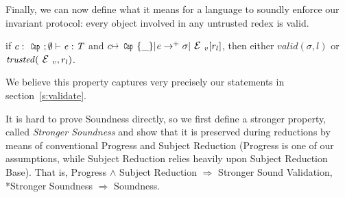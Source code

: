 \noindent Finally, we can now define what it means for a language to soundly enforce our invariant protocol: every object involved in any untrusted redex is valid.

\begin{theorem}[Soundness]
if $c:\Kw{Cap};\emptyset\vdash \e: \T$ and
$c\mapsto\Kw{Cap}\{\_\}|\e\rightarrow^+ \sigma|\ctx_v[r_l]$, then
either $valid(\sigma,l)$ or $\mathit{trusted}(\ctx_v,r_l)$.
\end{theorem}


We believe this property captures very precisely our statements in section~\ref{s:validate}.

It is hard to prove Soundness directly,
so we first define a stronger property,
called \emph{Stronger Soundness} and
show that it is preserved during reductions by means of conventional
Progress and Subject Reduction (Progress is one of our assumptions,
while Subject Reduction relies heavily upon Subject Reduction Base).
That is,
Progress $\wedge$ Subject Reduction $\Rightarrow$ Stronger Sound Validation,
\\*Stronger Soundness $\Rightarrow$ Soundness.

